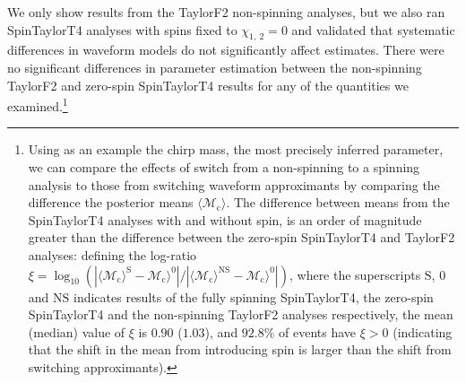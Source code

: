 We only show results from the TaylorF2 non-spinning analyses, but we also ran SpinTaylorT4 analyses with spins fixed to $\chi_{1,~2}=0$ and validated that systematic differences in waveform models do not significantly affect estimates. There were no significant differences in parameter estimation between the non-spinning TaylorF2 and zero-spin SpinTaylorT4 results for any of the quantities we examined.\footnote{Using as an example the chirp mass, the most precisely inferred parameter, we can compare the effects of switch from a non-spinning to a spinning analysis to those from switching waveform approximants by comparing the difference the posterior means $\langle \mathcal{M}_\mathrm{c}\rangle$. The difference between means from the SpinTaylorT4 analyses with and without spin, is an order of magnitude greater than the difference between the zero-spin SpinTaylorT4 and TaylorF2 analyses: defining the log-ratio $\xi = \log_{10}(|\langle \mathcal{M}_\mathrm{c}\rangle^\mathrm{S} - \mathcal{M}_\mathrm{c}\rangle^0|/|\langle \mathcal{M}_\mathrm{c}\rangle^\mathrm{NS} - \mathcal{M}_\mathrm{c}\rangle^0|)$, where the superscripts $\mathrm{S}$, $0$ and $\mathrm{NS}$ indicates results of the fully spinning SpinTaylorT4, the zero-spin SpinTaylorT4 and the non-spinning TaylorF2 analyses respectively, the mean (median) value of $\xi$ is $0.90$ ($1.03$), and $92.8\%$ of events have $\xi > 0$ (indicating that the shift in the mean from introducing spin is larger than the shift from switching approximants).}
  
  
  
  
  
  
  
  
  
  
  
  
  
  
  
  
  
  
  